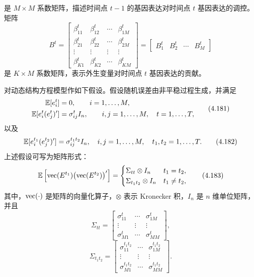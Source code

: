 是 $M\times M$ 系数矩阵，描述时间点 $t-1$ 的基因表达对时间点 $t$ 基因表达的调控。矩阵
\begin{equation}
B^t=\begin{bmatrix}
\beta_{11}^t&\beta_{12}^t&\cdots&\beta_{1M}^t\\
\beta_{21}^t&\beta_{22}^t&\cdots&\beta_{2M}^t\\
\vdots&\vdots&\vdots&\vdots\\
\beta_{K1}^t&\beta_{K2}^t&\cdots&\beta_{KM}^t
\end{bmatrix}
=\begin{bmatrix}B_1^t&B_2^t&\cdots&B_M^t\end{bmatrix}\tag{4.180}
\end{equation}
是 $K\times M$ 系数矩阵，表示外生变量对时间点 $t$ 基因表达的贡献。

对动态结构方程模型作如下假设。假设随机误差由非平稳过程生成，并满足
\begin{equation}
\begin{aligned}
\mathbb{E}[e_i^t]&=0,\qquad i=1,\ldots,M,\\
\mathbb{E}[e_i^t(e_j^t)']&=\sigma_{ij}^tI_n,
\qquad i,j=1,\ldots,M,\quad t=1,\ldots,T,
\end{aligned}\tag{4.181}
\end{equation}
以及
\begin{equation}
\mathbb{E}[e_i^{t_1}(e_j^{t_2})']
 =\sigma_{ij}^{t_1t_2}I_n,\quad
i,j=1,\ldots,M,\quad t_1,t_2=1,\ldots,T.\tag{4.182}
\end{equation}
上述假设可写为矩阵形式：
\begin{equation}
\mathbb{E}\left[\operatorname{vec}(E^{t_1})\bigl(\operatorname{vec}(E^{t_2})\bigr)'\right]
=\begin{cases}
\Sigma_{tt}\otimes I_n&t_1=t_2,\\
\Sigma_{t_1t_2}\otimes I_n&t_1\ne t_2,
\end{cases}\tag{4.183}
\end{equation}
其中，$\operatorname{vec}(\cdot)$ 是矩阵的向量化算子，$\otimes$ 表示 Kronecker 积，$I_n$ 是 $n$ 维单位矩阵，并且
\[
\Sigma_{tt}=\begin{bmatrix}
\sigma_{11}^t&\cdots&\sigma_{1M}^t\\
\vdots&\vdots&\vdots\\
\sigma_{M1}^t&\cdots&\sigma_{MM}^t
\end{bmatrix},
\]
\begin{equation}
\Sigma_{t_1t_2}=\begin{bmatrix}
\sigma_{11}^{t_1t_2}&\cdots&\sigma_{1M}^{t_1t_2}\\
\vdots&\vdots&\vdots\\
\sigma_{M1}^{t_1t_2}&\cdots&\sigma_{MM}^{t_1t_2}
\end{bmatrix}.\tag{4.184}
\end{equation}
